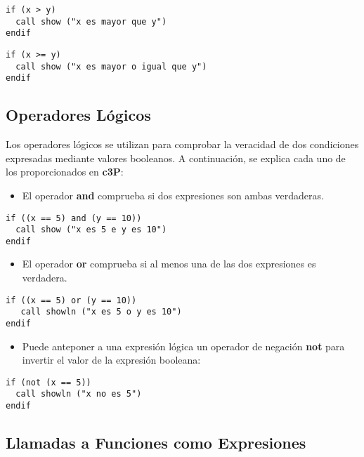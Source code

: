 \begin{verbatim}
if (x > y)
  call show ("x es mayor que y")
endif
\end{verbatim}

\begin{verbatim}
if (x >= y)
  call show ("x es mayor o igual que y")
endif
\end{verbatim}

\subsection{Operadores Lógicos}

Los operadores lógicos se utilizan para comprobar la veracidad de dos
condiciones expresadas mediante valores booleanos. A continuación, se
explica cada uno de los proporcionados en \textbf{c3P}:

\begin{itemize}
    \item El operador \textbf{and} comprueba si dos expresiones son ambas verdaderas.
\end{itemize}

\begin{verbatim}
if ((x == 5) and (y == 10))
  call show ("x es 5 e y es 10")
endif
\end{verbatim}

\begin{itemize}
    \item El operador \textbf{or} comprueba si al menos una de las dos expresiones es verdadera.
\end{itemize}

\begin{verbatim}
if ((x == 5) or (y == 10))
   call showln ("x es 5 o y es 10")
endif
\end{verbatim}

\begin{itemize}
    \item Puede anteponer a una expresión lógica un operador de negación \textbf{not} para invertir el valor de la expresión booleana:
\end{itemize}

\begin{verbatim}
if (not (x == 5))
  call showln ("x no es 5")
endif
\end{verbatim}

\subsection{Llamadas a Funciones como Expresiones}

